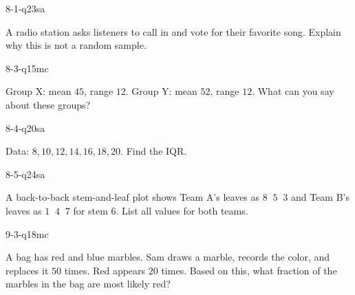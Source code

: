 \begin{practiceQuestion}{8-1-q23}{sa}
\begin{questionText}
A radio station asks listeners to call in and vote for their favorite song. Explain why this is not a random sample.
\end{questionText}
\end{practiceQuestion}

\begin{practiceQuestion}{8-3-q15}{mc}
\begin{questionText}
Group X: mean $45$, range $12$. Group Y: mean $52$, range $12$. What can you say about these groups?
\end{questionText}
\end{practiceQuestion}

\begin{practiceQuestion}{8-4-q20}{sa}
\begin{questionText}
Data: $8, 10, 12, 14, 16, 18, 20$. Find the IQR.
\end{questionText}
\end{practiceQuestion}

\begin{practiceQuestion}{8-5-q24}{sa}
\begin{questionText}
A back-to-back stem-and-leaf plot shows Team A's leaves as $8\;\;5\;\;3$ and Team B's leaves as $1\;\;4\;\;7$ for stem $6$. List all values for both teams.
\end{questionText}
\end{practiceQuestion}

\begin{practiceQuestion}{9-3-q18}{mc}
\begin{questionText}
A bag has red and blue marbles. Sam draws a marble, records the color, and replaces it $50$ times. Red appears $20$ times. Based on this, what fraction of the marbles in the bag are most likely red?
\end{questionText}
\end{practiceQuestion}

